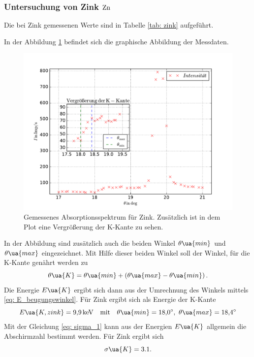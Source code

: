 \subsubsection{Untersuchung von Zink $\ce{Zn}$}\label{sec: zink}
Die bei Zink gemessenen Werte sind in Tabelle \ref{tab: zink} aufgeführt.

In der Abbildung \ref{fig: absotp_zink} befindet sich die graphische Abbildung der Messdaten.
\begin{figure}
  \centering
  \includegraphics[width=1\textwidth]{../Messdaten/zink.pdf}
  \caption{Gemessenes Absorptionsspektrum für Zink. Zusätzlich ist in dem Plot eine Vergrößerung der K-Kante zu sehen.} %
  \label{fig: absotp_zink}
\end{figure}
In der Abbildung sind zusätzlich auch die beiden Winkel $\theta\ua{min}$ und $\theta\ua{max}$
eingezeichnet. Mit Hilfe dieser beiden Winkel soll der Winkel, für die K-Kante genährt werden zu %
\begin{equation}
  \label{eq:theta_k}
  \theta\ua{K}=\theta\ua{min}+\left(\theta\ua{max}-\theta\ua{min}\right).
\end{equation}
Die Energie $E\ua{K}$ ergibt sich dann aus der Umrechnung des Winkels mittels \eqref{eq: E_beugungswinkel}.
Für Zink ergibt sich als Energie der K-Kante
\begin{equation*}
  E\ua{K,zink}=\SI{9.9}{\kilo\eV} \quad \text{mit}\quad \theta\ua{min}=\SI{18.0}{\degree},\, \,   \theta\ua{max}=\SI{18.4}{\degree}
\end{equation*}
Mit der Gleichung \eqref{eq: sigma_1} kann aus der Energien $E\ua{K}$ allgemein die Abschirmzahl
bestimmt werden.
Für Zink ergibt sich
\begin{equation}
  \label{eq: abschirm_zink}
  \sigma\ua{K}=3.1.
\end{equation}
\FloatBarrier
\FloatBarrier

